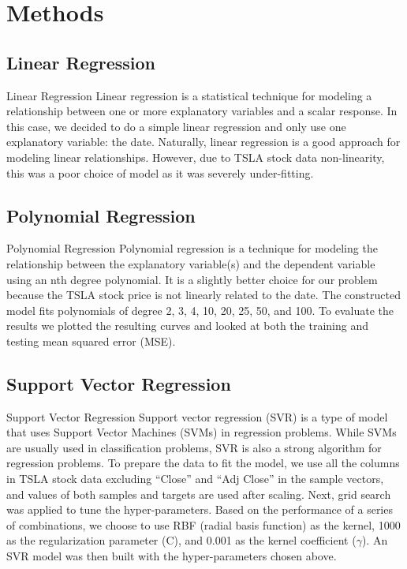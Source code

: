 \documentclass[12pt,a4paper]{article}
\begin{document}
\section{Methods}
\subsection{Linear Regression}

Linear Regression
Linear regression is a statistical technique for modeling a relationship between one or more explanatory variables and a scalar response. In this case, we decided to do a simple linear regression and only use one explanatory variable: the date. Naturally, linear regression is a good approach for modeling linear relationships. However, due to TSLA stock data non-linearity, this was a poor choice of model as it was severely under-fitting.

\subsection{Polynomial Regression}
Polynomial Regression
Polynomial regression is a technique for modeling the relationship between the explanatory variable(s) and the dependent variable using an nth degree polynomial. It is a slightly better choice for our problem because the TSLA stock price is not linearly related to the date. The constructed model fits polynomials of degree 2, 3, 4, 10, 20, 25, 50, and 100. To evaluate the results we plotted the resulting curves and looked at both the training and testing mean squared error (MSE).

\subsection{Support Vector Regression}
Support Vector Regression
Support vector regression (SVR) is a type of model that uses Support Vector Machines (SVMs) in regression problems. While SVMs are usually used in classification problems, SVR is also a strong algorithm for regression problems. To prepare the data to fit the model, we use all the columns in TSLA stock data excluding “Close” and “Adj Close” in the sample vectors, and values of both samples and targets are used after scaling. 
Next, grid search was applied to tune the hyper-parameters. Based on the performance of a series of combinations, we choose to use RBF (radial basis function) as the kernel, 1000 as the regularization parameter (C), and 0.001 as the kernel coefficient ($\gamma$). An SVR model was then built with the hyper-parameters chosen above. 
\end{document}
